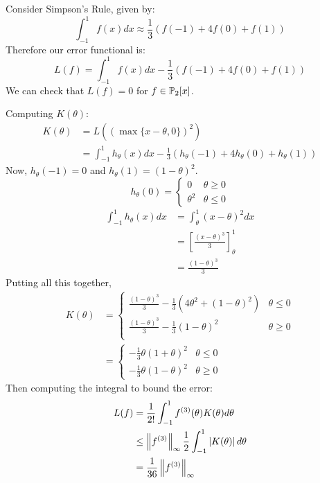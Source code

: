 \documentclass[../Main.tex]{subfiles}
\begin{document}
\begin{example}
    Consider Simpson's Rule, given by:
    \begin{equation*}
        \int_{-1}^{1} f(x) dx \approx \frac13 (f(-1) + 4f(0) + f(1))
    \end{equation*}
    Therefore our error functional is:
    \begin{equation*}
        L(f) = \int_{-1}^{1} f(x) dx - \frac13 (f(-1) + 4f(0) + f(1))
    \end{equation*}
    We can check that $L(f) = 0$ for $f \in \P_2[x]$.

    Computing $K(\theta)$:
    \begin{align*}
        K(\theta) &= L\left(\left(\max\{x - \theta, 0\}\right)^2\right) \\
        &= \int_{-1}^{1} h_\theta(x) dx - \frac13 \left(h_\theta(-1) + 4 h_\theta(0) + h_\theta(1)\right)
    \end{align*}
    Now, $h_\theta(-1) = 0$ and $h_\theta(1) = (1 - \theta)^2$.
    \begin{equation*}
        h_\theta(0) =
        \begin{cases}
            0 & \theta \geq 0 \\
            \theta^2 & \theta \leq 0
        \end{cases}
    \end{equation*}
    \begin{align*}
        \int_{-1}^{1} h_\theta(x) dx &= \int_\theta^1 (x - \theta)^2 dx \\
        &= \left[\frac{(x - \theta)^3}{3}\right]_\theta^1 \\
        &= \frac{(1 - \theta)^3}{3}
    \end{align*}
    Putting all this together,
    \begin{align*}
        K(\theta) &=
        \begin{cases}
            \frac{(1 - \theta)^3}{3} - \frac13(4\theta^2 + (1 - \theta)^2) & \theta \leq 0 \\
            \frac{(1 - \theta)^3}{3} - \frac13(1 - \theta)^2 & \theta \geq 0 \\
        \end{cases}\\
        &= \begin{cases}
            -\frac13 \theta(1 + \theta)^2 & \theta \leq 0 \\
            -\frac13 \theta(1 - \theta)^2 & \theta \geq 0
        \end{cases}
    \end{align*}
    Then computing the integral to bound the error:
    \begin{align*}
        L(f) &= \frac{1}{2!} \int_{-1}^{1} f^{(3)}(\theta) K(\theta) d\theta \\
        &\leq \norm{f^{(3)}}_\infty \frac12 \int_{-1}^{1} \abs{K(\theta)} d\theta \\
        &= \frac{1}{36} \norm{f^{(3)}}_\infty
    \end{align*}
\end{example}
\end{document}
